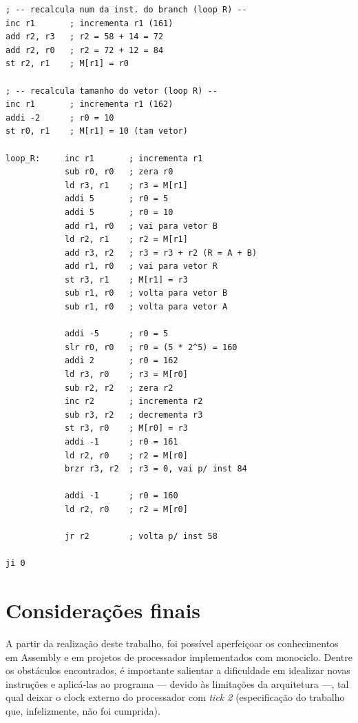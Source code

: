 \documentclass[twocolumn, 11pt]{article}
\begin{document}
\begin{lstlisting}
; -- recalcula num da inst. do branch (loop R) --
inc r1       ; incrementa r1 (161)
add r2, r3   ; r2 = 58 + 14 = 72
add r2, r0   ; r2 = 72 + 12 = 84
st r2, r1    ; M[r1] = r0

; -- recalcula tamanho do vetor (loop R) --
inc r1       ; incrementa r1 (162)
addi -2      ; r0 = 10
st r0, r1    ; M[r1] = 10 (tam vetor)

loop_R:     inc r1       ; incrementa r1
            sub r0, r0   ; zera r0
            ld r3, r1    ; r3 = M[r1]
            addi 5       ; r0 = 5
            addi 5       ; r0 = 10
            add r1, r0   ; vai para vetor B
            ld r2, r1    ; r2 = M[r1]
            add r3, r2   ; r3 = r3 + r2 (R = A + B)
            add r1, r0   ; vai para vetor R
            st r3, r1    ; M[r1] = r3
            sub r1, r0   ; volta para vetor B
            sub r1, r0   ; volta para vetor A

            addi -5      ; r0 = 5
            slr r0, r0   ; r0 = (5 * 2^5) = 160
            addi 2       ; r0 = 162
            ld r3, r0    ; r3 = M[r0]
            sub r2, r2   ; zera r2
            inc r2       ; incrementa r2
            sub r3, r2   ; decrementa r3
            st r3, r0    ; M[r0] = r3
            addi -1      ; r0 = 161
            ld r2, r0    ; r2 = M[r0]
            brzr r3, r2  ; r3 = 0, vai p/ inst 84

            addi -1      ; r0 = 160
            ld r2, r0    ; r2 = M[r0]

            jr r2        ; volta p/ inst 58

ji 0
\end{lstlisting}

\section{Considerações finais}

A partir da realização deste trabalho, foi possível aperfeiçoar os conhecimentos em Assembly e em projetos de processador implementados com monociclo. Dentre os obstáculos encontrados, é importante salientar a dificuldade em idealizar novas instruções e aplicá-las ao programa — devido às limitações da arquitetura —, tal qual deixar o clock externo do processador com \textit{tick 2} (especificação do trabalho que, infelizmente, não foi cumprida).
\end{document}
